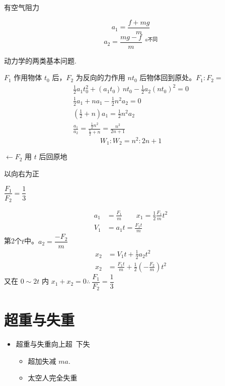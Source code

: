 有空气阻力


\[
a_1=\frac{f+mg}{m}
\]
\[
a_2=\frac{mg-f}{m}\ \,{}^{a\text{不同}}
\]

动力学的两类基本问题.

$F_1$ 作用物体 $t_0$ 后，$F_2$ 为反向的力作用 $nt_0$ 后物体回到原处。$F_1:F_2=$
\begin{gather*}
\tfrac12 a_1t_0^2+(a_1t_0)\,nt_0-\tfrac12 a_2(nt_0)^2=0\\
\tfrac12 a_1+na_1-\tfrac12 n^2a_2=0\\
\left(\tfrac12+n\right)a_1=\tfrac12 n^2a_2\\
\frac{a_1}{a_2}=\frac{\frac12 n^2}{\frac12+n}=\frac{n^2}{2n+1}
\end{gather*}
\[ W_1:W_2=n^2:2n+1 \]

\begin{problem}
$\leftarrow F_2$ 用 $t$ 后回原地
\begin{solution}
以向右为正

$\dfrac{F_1}{F_2}=\dfrac13$

\begin{align*}
a_1&=\frac{F_1}{m}\qquad x_1=\frac12\frac{F_1}{m}t^2\\
V_1&=a_1t=\frac{F_1t}{m}
\end{align*}
第2个$t$中。$a_2=\dfrac{-F_2}{m}$
\begin{align*}
x_2&=V_1t+\frac12a_2t^2\\
x_2&=\frac{F_1t}{m}+\frac12\left(-\frac{F_2}{m}\right)t^2 %
\end{align*}
又在 $0\sim2t$ 内 $x_1+x_2=0$\quad $\therefore\ \dfrac{F_1}{F_2}=\dfrac13$
\end{solution}
\end{problem}


\section{超重与失重}
\begin{itemize}
\item 超重与失重\quad 向上超\ 下失
  \begin{itemize}
  \item 超加失减 $ma$.
  \item 太空人完全失重
  \end{itemize}
\end{itemize}

